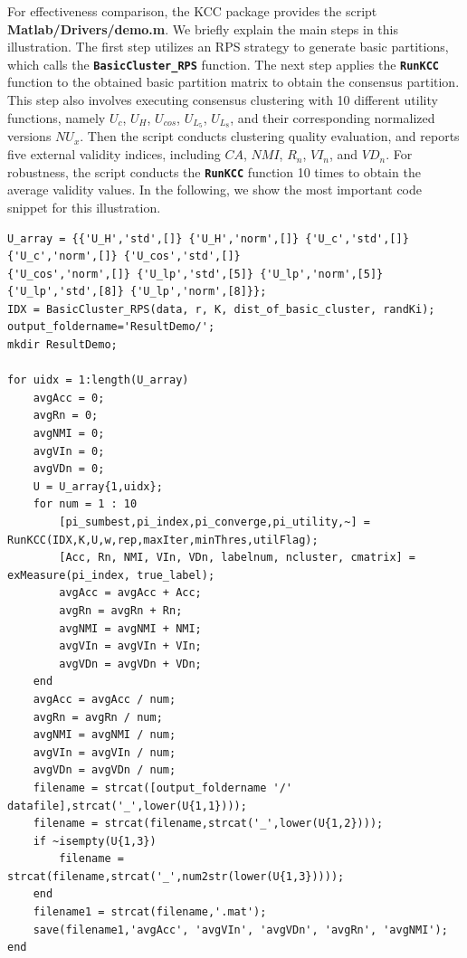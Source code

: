 \documentclass[10pt]{acmtrans2e}
\newcommand{\package}[1]{\textsf{#1}\xspace} %
\newcommand{\function}[1]{\textbf{\texttt{#1}}}
\begin{document}
For effectiveness comparison, the \package{KCC} package provides the script \textbf{Matlab/Drivers/demo.m}. We briefly explain the main steps in this illustration. The first step utilizes an RPS strategy to generate basic partitions, which calls the \function{BasicCluster\_RPS} function. The next step applies the \function{RunKCC} function to the obtained basic partition matrix to obtain the consensus partition. This step also involves executing consensus clustering with 10 different utility functions, namely $U_c$, $U_H$, $U_{cos}$, $U_{L_5}$, $U_{L_8}$, and their corresponding normalized versions $NU_x$. Then the script conducts clustering quality evaluation, and reports five external validity indices, including $CA$, $NMI$, $R_n$, $VI_n$, and $VD_n$. For robustness, the script conducts the \function{RunKCC} function 10 times to obtain the average validity values. In the following, we show the most important code snippet for this illustration.
\begin{lstlisting}[caption={Using \function{demo.m} to evaluate the clustering quality of the \package{KCC} package with different utility functions.},label=lst:evaqualityutility]
U_array = {{'U_H','std',[]} {'U_H','norm',[]} {'U_c','std',[]} {'U_c','norm',[]} {'U_cos','std',[]} 
{'U_cos','norm',[]} {'U_lp','std',[5]} {'U_lp','norm',[5]} {'U_lp','std',[8]} {'U_lp','norm',[8]}};
IDX = BasicCluster_RPS(data, r, K, dist_of_basic_cluster, randKi);
output_foldername='ResultDemo/';
mkdir ResultDemo;

for uidx = 1:length(U_array)
    avgAcc = 0;
    avgRn = 0;
    avgNMI = 0;
    avgVIn = 0;
    avgVDn = 0;
    U = U_array{1,uidx};
    for num = 1 : 10
        [pi_sumbest,pi_index,pi_converge,pi_utility,~] = RunKCC(IDX,K,U,w,rep,maxIter,minThres,utilFlag);
        [Acc, Rn, NMI, VIn, VDn, labelnum, ncluster, cmatrix] = exMeasure(pi_index, true_label);
        avgAcc = avgAcc + Acc;
        avgRn = avgRn + Rn;
        avgNMI = avgNMI + NMI;
        avgVIn = avgVIn + VIn;
        avgVDn = avgVDn + VDn;
    end
    avgAcc = avgAcc / num;
    avgRn = avgRn / num;
    avgNMI = avgNMI / num;
    avgVIn = avgVIn / num;
    avgVDn = avgVDn / num;
    filename = strcat([output_foldername '/' datafile],strcat('_',lower(U{1,1})));
    filename = strcat(filename,strcat('_',lower(U{1,2})));
    if ~isempty(U{1,3})
        filename = strcat(filename,strcat('_',num2str(lower(U{1,3}))));
    end
    filename1 = strcat(filename,'.mat');
    save(filename1,'avgAcc', 'avgVIn', 'avgVDn', 'avgRn', 'avgNMI');
end
\end{lstlisting}
\end{document}
